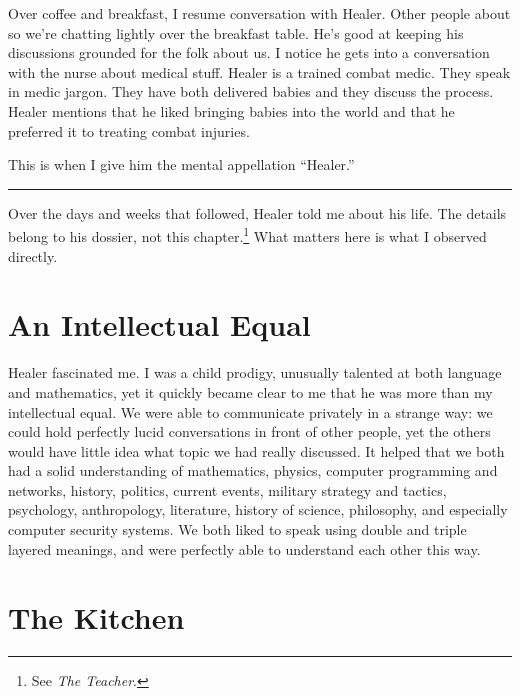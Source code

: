 Over coffee and breakfast, I resume conversation with Healer. Other people about so we're chatting lightly over the breakfast table. He's good at keeping his discussions grounded for the folk about us. I notice he gets into a conversation with the nurse about medical stuff. Healer is a trained combat medic. They speak in medic jargon. They have both delivered babies and they discuss the process. Healer mentions that he liked bringing babies into the world and that he preferred it to treating combat injuries.

This is when I give him the mental appellation ``Healer.''

\vspace{1cm}\noindent\rule{0.5\textwidth}{0.5pt}\vspace{0.5cm}


Over the days and weeks that followed, Healer told me about his life. The details belong to his dossier, not this chapter.\footnote{See \textit{The Teacher}.} What matters here is what I observed directly.

\section*{An Intellectual Equal}
\label{pos02:an-intellectual-equal}

Healer fascinated me. I was a child prodigy, unusually talented at both language and mathematics, yet it quickly became clear to me that he was more than my intellectual equal. We were able to communicate privately in a strange way: we could hold perfectly lucid conversations in front of other people, yet the others would have little idea what topic we had really discussed. It helped that we both had a solid understanding of mathematics, physics, computer programming and networks, history, politics, current events, military strategy and tactics, psychology, anthropology, literature, history of science, philosophy, and especially computer security systems. We both liked to speak using double and triple layered meanings, and were perfectly able to understand each other this way.

\section*{The Kitchen}
\label{pos02:the-kitchen}

